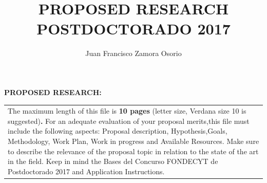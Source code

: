 \documentclass[10pt]{article}
\author{Juan Francisco Zamora Osorio}
\title{PROPOSED RESEARCH POSTDOCTORADO 2017}
\begin{document}
\noindent \textbf{PROPOSED RESEARCH:}

\noindent \textbf{}

{\raggedright\vspace{3pt} \noindent
\begin{tabular}{|p{514pt}|}
\hline
\parbox{514pt} {\raggedright  \vspace{3pt}
The maximum length of this file is \textbf{10 pages} (letter size, Verdana size 10 is suggested)\textbf{. }For an adequate evaluation of your proposal merits,this file must include the following aspects: Proposal description, Hypothesis,Goals, Methodology, Work Plan, Work in progress and
Available Resources.
Make sure to describe the relevance of the proposal topic in relation to the state of the art in the field.
Keep in mind the Bases del Concurso FONDECYT de Postdoctorado 2017 and Application Instructions.} \\
\hline
\end{tabular}
\vspace{2pt}

}


\end{document}
